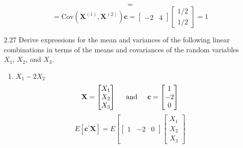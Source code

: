 \begin{enumerate}[font=\bfseries]
\begin{enumerate}
\[                =
            \]
            \[
                =
                \text{Cov}\left(\mathbf{X}^{(1)},\mathbf{X}^{(2)}\right)\mathbf{c}
                =
                \begin{bmatrix}
                    -2 & 4
                \end{bmatrix}
                \begin{bmatrix}
                    1/2 \\
                    1/2
                \end{bmatrix}
                =
                1
            \]
        \end{enumerate}
        \item[2.27] Derive expressions for the mean and variances of the following linear combinations in
        terms of the means and covariances of the random variables $X_1$, $X_2$, and $X_3$.
        \begin{enumerate}
            \item $X_1 - 2X_2$
            \[
                \textbf{X}
                =
                \begin{bmatrix}
                    X_1 \\
                    X_2 \\
                    X_3
                \end{bmatrix}
                \hspace{0.2in}\text{and}\hspace{0.2in}
                \textbf{c}
                =
                \begin{bmatrix}
                    1 \\
                    -2 \\
                    0
                \end{bmatrix}
            \]
            \[
                E\left[\textbf{c}^\prime\textbf{X}\right]
                =
                E\left[
                \begin{bmatrix}
                    1 & -2 & 0
                \end{bmatrix}
                    \begin{bmatrix}
                    X_1 \\
                    X_2 \\
                    X_3
                \end{bmatrix}
\]
\end{enumerate}
\end{enumerate}
